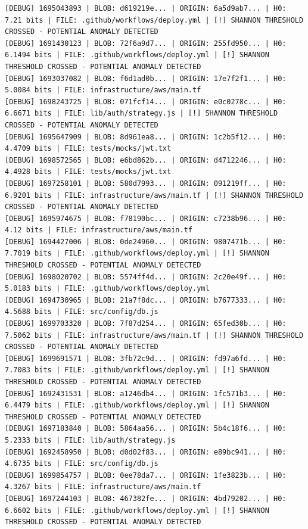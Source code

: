 \documentclass[12pt, a4paper, oneside]{report}
\begin{document}
\begin{lstlisting}[basicstyle=\tiny\ttfamily]
[DEBUG] 1695043893 | BLOB: d619219e... | ORIGIN: 6a5d9ab7... | H0: 7.21 bits | FILE: .github/workflows/deploy.yml | [!] SHANNON THRESHOLD CROSSED - POTENTIAL ANOMALY DETECTED
[DEBUG] 1691430123 | BLOB: 72f6a9d7... | ORIGIN: 255fd950... | H0: 6.1494 bits | FILE: .github/workflows/deploy.yml | [!] SHANNON THRESHOLD CROSSED - POTENTIAL ANOMALY DETECTED
[DEBUG] 1693037082 | BLOB: f6d1ad0b... | ORIGIN: 17e7f2f1... | H0: 5.0084 bits | FILE: infrastructure/aws/main.tf
[DEBUG] 1698243725 | BLOB: 071fcf14... | ORIGIN: e0c0278c... | H0: 6.6671 bits | FILE: lib/auth/strategy.js | [!] SHANNON THRESHOLD CROSSED - POTENTIAL ANOMALY DETECTED
[DEBUG] 1695647909 | BLOB: 8d961ea8... | ORIGIN: 1c2b5f12... | H0: 4.4709 bits | FILE: tests/mocks/jwt.txt
[DEBUG] 1698572565 | BLOB: e6bd862b... | ORIGIN: d4712246... | H0: 4.4928 bits | FILE: tests/mocks/jwt.txt
[DEBUG] 1697258101 | BLOB: 580d7993... | ORIGIN: 091219ff... | H0: 6.9201 bits | FILE: infrastructure/aws/main.tf | [!] SHANNON THRESHOLD CROSSED - POTENTIAL ANOMALY DETECTED
[DEBUG] 1695974675 | BLOB: f78190bc... | ORIGIN: c7238b96... | H0: 4.12 bits | FILE: infrastructure/aws/main.tf
[DEBUG] 1694427006 | BLOB: 0de24960... | ORIGIN: 9807471b... | H0: 7.7019 bits | FILE: .github/workflows/deploy.yml | [!] SHANNON THRESHOLD CROSSED - POTENTIAL ANOMALY DETECTED
[DEBUG] 1698020702 | BLOB: 5574ff4d... | ORIGIN: 2c20e49f... | H0: 5.0183 bits | FILE: .github/workflows/deploy.yml
[DEBUG] 1694730965 | BLOB: 21a7f8dc... | ORIGIN: b7677333... | H0: 4.5688 bits | FILE: src/config/db.js
[DEBUG] 1699703320 | BLOB: 7f87d254... | ORIGIN: 65fed30b... | H0: 7.5062 bits | FILE: infrastructure/aws/main.tf | [!] SHANNON THRESHOLD CROSSED - POTENTIAL ANOMALY DETECTED
[DEBUG] 1699691571 | BLOB: 3fb72c9d... | ORIGIN: fd97a6fd... | H0: 7.7083 bits | FILE: .github/workflows/deploy.yml | [!] SHANNON THRESHOLD CROSSED - POTENTIAL ANOMALY DETECTED
[DEBUG] 1692431531 | BLOB: a1246db4... | ORIGIN: 1fc571b3... | H0: 6.4479 bits | FILE: .github/workflows/deploy.yml | [!] SHANNON THRESHOLD CROSSED - POTENTIAL ANOMALY DETECTED
[DEBUG] 1697183840 | BLOB: 5864aa56... | ORIGIN: 5b4c18f6... | H0: 5.2333 bits | FILE: lib/auth/strategy.js
[DEBUG] 1692458950 | BLOB: d0d02f83... | ORIGIN: e89bc941... | H0: 4.6735 bits | FILE: src/config/db.js
[DEBUG] 1699854757 | BLOB: 0ee78da7... | ORIGIN: 1fe3823b... | H0: 4.3267 bits | FILE: infrastructure/aws/main.tf
[DEBUG] 1697244103 | BLOB: 467382fe... | ORIGIN: 4bd79202... | H0: 6.6602 bits | FILE: .github/workflows/deploy.yml | [!] SHANNON THRESHOLD CROSSED - POTENTIAL ANOMALY DETECTED

\end{lstlisting}
\end{document}
